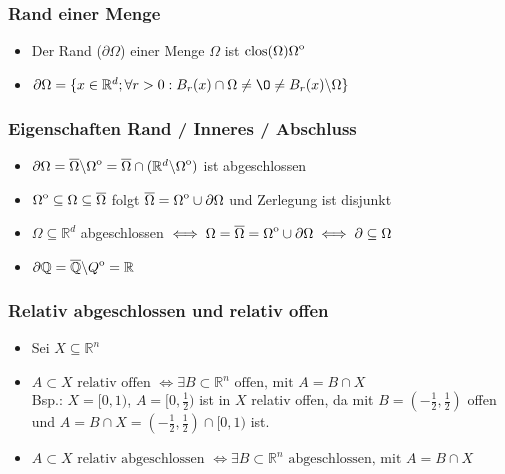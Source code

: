\documentclass[a3paper, 11pt, landscape]{scrartcl}
\newcommand{\Rd}{\mathbb{R}^d}
\newcommand{\Rn}{\mathbb{R}^n}
\newcommand{\interior}[1]{%
  {\kern0pt#1}^{\mathrm{o}}%
}
\begin{document}
\begin{multicols*}{3}
	\subsubsection{Rand einer Menge}
	\begin{itemize}
	    \item Der Rand ($\partial \Omega$) einer Menge $\Omega$ ist $\text{clos}(\Omega)\interior{\Omega}$
        \item $\partial\Omega =\{x\in\Rd;\forall r > 0 :B_r(x)\cap\Omega \neq \O\neq B_r(x)\backslash\Omega\}$
    \end{itemize}
	
	\subsubsection{Eigenschaften Rand / Inneres / Abschluss}
	\begin{itemize}
	    \item $\partial\Omega=\overline{\Omega}\backslash\interior{\Omega}=\overline{\Omega}\cap(\Rd\backslash\interior{\Omega})$ ist abgeschlossen
	    \item $\interior{\Omega}\subseteq\Omega\subseteq\overline{\Omega}$ folgt $\overline{\Omega}=\interior{\Omega}\cup\partial\Omega$ und Zerlegung ist disjunkt
	    \item $\Omega\subseteq\Rd $ abgeschlossen $\iff \Omega=\overline{\Omega}=\interior{\Omega}\cup\partial\Omega\iff \partial\subseteq\Omega$
	    \item $\partial\mathbb{Q}=\overline{\mathbb{Q}}\backslash\interior{Q}=\mathbb{R}$
	    
	\end{itemize}
	
	\subsubsection{Relativ abgeschlossen und relativ offen}
	\begin{itemize}
	    \item Sei $X\subseteq\Rn$
	    \item $A \subset X \text { relativ offen } \Longleftrightarrow \exists B \subset \mathbb{R}^{n} \text { offen, mit } A=B \cap X$\\
	    Bsp.: $X=[0,1)$, $A=[0,\frac{1}{2})$ ist in $X$ relativ offen, da mit $B=(-\frac{1}{2},\frac{1}{2})$ offen und $ A=B\cap X = (-\frac{1}{2},\frac{1}{2})\cap [0,1)$ ist.
	    
	    \item $A \subset X \text { relativ abgeschlossen } \Longleftrightarrow \exists B \subset \mathbb{R}^{n} \text { abgeschlossen, mit } A=B \cap X$
	\end{itemize}
	

\end{multicols*}
\end{document}
